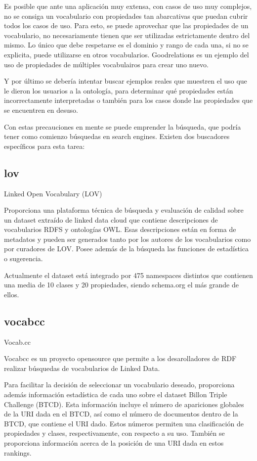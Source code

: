 Es posible que ante una aplicación muy extensa, con casos de uso muy complejos, no se consiga un vocabulario con propiedades tan abarcativas 
que puedan cubrir todos los casos de uso. 
Para esto, se puede aprovechar que las propiedades de un vocabulario, no necesariamente tienen que ser utilizadas estrictamente dentro del mismo.
Lo único que debe respetarse es el dominio y rango de cada una, si no se explicita, puede utilizarse en otros vocabularios.
Goodrelations es un ejemplo del uso de propiedades de múltiples vocabulairos para crear uno nuevo.

Y por último se debería intentar buscar ejemplos reales que muestren el uso que le dieron los usuarios a la ontología, para 
determinar qué propiedades están incorrectamente interpretadas o también para los casos donde las propiedades que se encuentren 
en desuso.

Con estas precauciones en mente se puede emprender la búsqueda, que podría tener como comienzo búsquedas en  search engines. 
Existen dos buscadores específicos para esta tarea:

\subsection{lov}

Linked Open Vocabulary (LOV)

Proporciona una plataforma técnica de búsqueda y evaluación de calidad sobre un dataset extraído de linked data cloud que contiene descripciones de vocabularios RDFS 
y ontologías OWL. Esas descripciones están en forma de metadatos y pueden ser generados tanto por los autores de los vocabularios como por curadores de LOV.
Posee además de la búsqueda las funciones de estadística o sugerencia.

Actualmente el dataset está integrado por 475 namespaces distintos que contienen una media de 10 clases y 20 propiedades, siendo schema.org el más grande de ellos.

\subsection{vocabcc}

Vocab.cc

Vocabcc es un proyecto opensource que permite a los desarolladores de RDF realizar búsquedas de vocabularios de Linked Data.

Para facilitar la decisión de seleccionar un vocabulario deseado, proporciona además información estadística de cada uno sobre el dataset Billon Triple Challenge (BTCD). 
 Esta información incluye el número de apariciones globales de la URI dada en el BTCD, así como el número de documentos dentro de la BTCD, que contiene el URI dado. Estos números permiten una clasificación de propiedades y clases, respectivamente, con respecto a su uso. También se proporciona información acerca de la posición de una URI dada en estos rankings.

